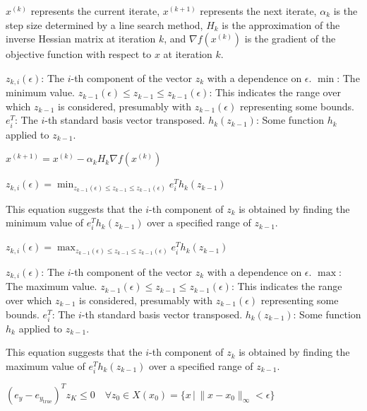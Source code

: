 
$x^{(k)}$ represents the current iterate,
$x^{(k+1)}$ represents the next iterate,
$\alpha_k$ is the step size determined by a line search method,
$H_k$ is the approximation of the inverse Hessian matrix at iteration $k$, and
$\nabla f(x^{(k)})$ is the gradient of the objective function with respect to $x$ at iteration $k$.

$z_{k,i}(\epsilon)$: The $i$-th component of the vector $z_k$ with a dependence on $\epsilon$.
$\min$: The minimum value.
$z_{k-1}(\epsilon) \leq z_{k-1} \leq z_{k-1}(\epsilon)$: This indicates the range over which $z_{k-1}$ is considered, presumably with $z_{k-1}(\epsilon)$ representing some bounds.
$e^T_i$: The $i$-th standard basis vector transposed.
$h_k(z_{k-1})$: Some function $h_k$ applied to $z_{k-1}$.

$x^{(k+1)} = x^{(k)} - \alpha_k H_k \nabla f(x^{(k)})$

$z_{k,i}(\epsilon) = \min_{z_{k-1}(\epsilon) \leq z_{k-1} \leq z_{k-1}(\epsilon)} e^T_i h_k(z_{k-1})$

This equation suggests that the $i$-th component of $z_k$ is obtained by finding the minimum value of $e^T_i h_k(z_{k-1})$ over a specified range of $z_{k-1}$.

$z_{k,i}(\epsilon) = \max_{z_{k-1}(\epsilon) \leq z_{k-1} \leq z_{k-1}(\epsilon)} e^T_i h_k(z_{k-1})$

$z_{k,i}(\epsilon)$: The $i$-th component of the vector $z_k$ with a dependence on $\epsilon$.
$\max$: The maximum value.
$z_{k-1}(\epsilon) \leq z_{k-1} \leq z_{k-1}(\epsilon)$: This indicates the range over which $z_{k-1}$ is considered, presumably with $z_{k-1}(\epsilon)$ representing some bounds.
$e^T_i$: The $i$-th standard basis vector transposed.
$h_k(z_{k-1})$: Some function $h_k$ applied to $z_{k-1}$.

This equation suggests that the $i$-th component of $z_k$ is obtained by finding the maximum value of $e^T_i h_k(z_{k-1})$ over a specified range of $z_{k-1}$.

$(e_y - e_{y_{\text{true}}})^T z_K \leq 0 \quad \forall z_0 \in X(x_0) = \{x \,|\, \|x - x_0\|_{\infty} < \epsilon\}$

